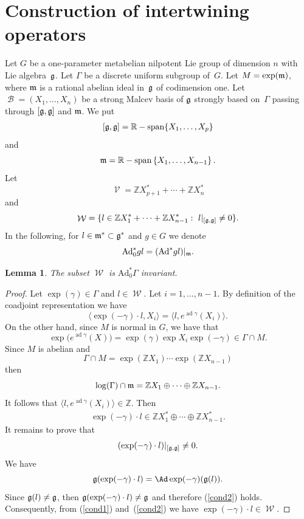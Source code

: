 \documentclass[11pt]{article}
\newtheorem{lemma}{Lemma}
\providecommand{\mathds}[1]{\mathbb{#1}}
\newcommand{\set}[1]{\left\{#1\right\}}
\DeclareMathOperator{\spann}{\mathds{R}-span}
\DeclareMathOperator{\ad}{ad}
\DeclareMathOperator{\nongen}{\mathcal{V}}
\DeclareMathOperator{\gen}{\mathcal{W}}
\DeclareMathOperator{\bbase}{\mathscr{B}}
\def\dsz{{\mathds Z}}
\begin{document}
\section{Construction of intertwining operators}\label{section5}

Let $G$ be a one-parameter metabelian nilpotent  Lie group  of
dimension $n$ with Lie algebra~$\frak g$.
 Let $\Gamma$ be a discrete uniform
subgroup of~$G$. Let $M = \exp(\frak m)$, where $\frak m$ is  a
rational abelian ideal in~$\frak g$ of codimension one.
 Let  $\bbase = (X_1, \ldots, X_n)$ be a
strong Malcev basis of $\frak g$ strongly based on~$\Gamma$ passing
through $[\frak g, \frak g]$ and $\frak m$. We put
\begin{gather}\label{alg-derivee}
[\frak g, \frak g] = \spann\lbrace X_1,\ldots, X_p\rbrace
\end{gather}
and
\[
\frak m
=\spann\set{X_1, \ldots, X_{n-1}}.
\]
  Let
\[
\nongen = \mathds{Z} X_{p+1}^*+\cdots+\mathds{Z}X_{n}^*
\]
and
\[
\gen= \{ l \in
\mathds{Z}X_1^*+\cdots +\mathds{Z}X_{n-1}^*:\ l\vert_{[\frak g,
\frak g]}\ne 0\}.
\]
 In the following, for $l \in \frak m^* \subset \frak g^*$ and $g
\in G$ we denote
\[
 \mathrm{Ad}_0^*g l =(\mathrm{Ad}^* g l)\vert_{\frak m}.
 \]


\begin{lemma}
 The subset $\gen$ is $  \mathrm{Ad}_0^* \Gamma$ invariant.
\end{lemma}
\begin{proof}
Let $\exp(\gamma) \in \Gamma$ and $l \in \gen$. Let $i=1, \ldots,
n-1$. By def\/inition of the coadjoint representation we have
\[
\langle \exp(-\gamma)\cdot l, X_i\rangle = \langle l, e^{\ad
\gamma}(X_i)\rangle.
\]
 On the other hand, since $M$ is normal in
$G$,  we have  that
\[
\exp\big(e^{\ad
\gamma}(X)\big) = \exp(\gamma) \exp{X_i} \exp(-\gamma) \in \Gamma \cap
M.
\] Since $M$ is abelian and
\[
\Gamma \cap M=\exp(\dsz X_1)\cdots
\exp(\dsz X_{n-1})
\] then
\[
\log(\Gamma) \cap \frak m=\dsz X_1\oplus\cdots\oplus \dsz
X_{n-1}.
\] It follows that  $\langle l, e^{\ad \gamma}(X_i)\rangle
\in \dsz$. Then
\begin{gather}\label{cond1}
\exp(-\gamma)\cdot l\in
\dsz X_1^*\oplus\cdots\oplus \dsz X_{n-1}^*.
\end{gather}
It remains to prove that
\begin{gather}\label{cond2}
(\exp(-\gamma)\cdot l)\vert_{[\frak g, \frak g]}\ne 0.
\end{gather}
We have
\[
\frak g(\exp(-\gamma)\cdot l)=\Ad\exp(-\gamma)(\frak g(l)).
\]
Since $\frak g(l)\ne \frak g$, then $\frak g(\exp(-\gamma)\cdot
l)\ne \frak g$ and therefore (\ref{cond2}) holds. Consequently, from
(\ref{cond1}) and~(\ref{cond2}) we have $\exp(-\gamma)\cdot l \in
\gen$.
\end{proof}
\end{document}
